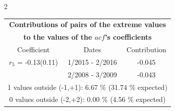 
\thispagestyle{empty}
\begin{multicols}{2}{ 
\begin{tabular}{ccc}
\multicolumn{3}{c}{\textbf{Contributions of pairs of the extreme values} }  \vspace{-.10in}  \\ 
\multicolumn{3}{c}{ \textbf{to the values of the $acf$'s coefficients}} \\ 
\hline 
\hline                  Coefficient  &  Dates &  Contribution \\ 
\hline 
  $r_{ 5}$ = -0.13(0.11) &       1/2015 -  2/2016 &       -0.045    \vspace{-.10in} \\ 
  &        2/2008 -  3/2009 &       -0.043  \vspace{-.02in}   \\ \hline 
  \multicolumn{3}{c}{               1 values outside (-1,+1):  6.67  \% (31.74  \% expected)}\vspace{-.10in} \\ 
\multicolumn{3}{c}{               0 values outside (-2,+2):  0.00 \%  (4.56 \% expected) } \\
 \end{tabular} \\ 
 } 
\end{multicols} 
